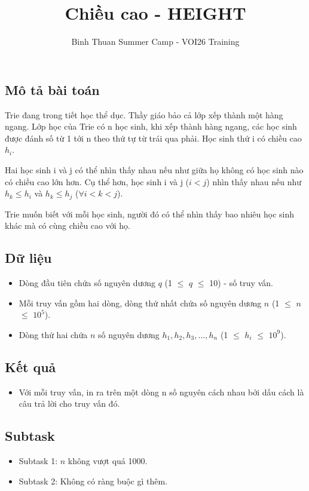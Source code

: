 \documentclass[12pt]{article}
\begin{document}
\title{Chiều cao - HEIGHT}
\author{Binh Thuan Summer Camp - VOI26 Training}
\maketitle

\setlength{\parindent}{0pt}
\setlength{\parskip}{1em} 

\subsection*{Mô tả bài toán}
Trie đang trong tiết học thể dục. Thầy giáo bảo cả lớp xếp thành một hàng ngang. 
Lớp học của Trie có n học sinh, khi xếp thành hàng ngang, các học sinh được đánh số từ 1 tới n theo 
thứ tự từ trái qua phải. Học sinh thứ i có chiều cao $h_i$.

Hai học sinh i và j có thể nhìn thấy nhau nếu như giữa họ không có học sinh nào có chiều cao lớn hơn. 
Cụ thể hơn, học sinh i và j ($i < j$) nhìn thấy nhau nếu như $h_k \leq h_i$ và $h_k \leq h_j$ ($\forall i < k < j$).

Trie muốn biết với mỗi học sinh, người đó có thể nhìn thấy bao nhiêu học sinh khác mà có cùng chiều cao với họ.

\subsection*{Dữ liệu}
\begin{itemize}
  \item Dòng đầu tiên chứa số nguyên dương \(q \) (1 $\leq$ $q$ $\leq$ 10) - số truy vấn.
  \item Mỗi truy vấn gồm hai dòng, dòng thứ nhất chứa số nguyên dương $n$ (1 $\leq$ $n$ $\leq$ $10^5$).
  \item Dòng thứ hai chứa $n$ số nguyên dương $h_1, h_2, h_3,..., h_n $ (1 $\leq$ $h_i$ $\leq$ $10^9$).
\end{itemize}

\subsection*{Kết quả}
\begin{itemize} 
  \item Với mỗi truy vấn, in ra trên một dòng n số nguyên cách nhau bởi dấu cách là câu trả lời cho truy vấn đó.
\end{itemize}

\subsection*{Subtask}
\begin{itemize}
  \item Subtask 1: \(n\) không vượt quá 1000.
  \item Subtask 2: Không có ràng buộc gì thêm.
\end{itemize}
\end{document}
